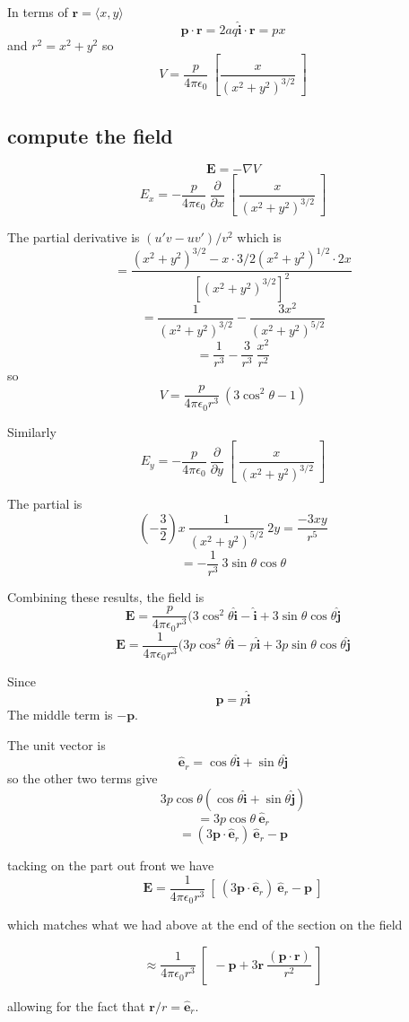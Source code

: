 \documentclass[11pt, oneside]{article}
\begin{document}
In terms of $\mathbf{r} = \langle x, y \rangle$
\[ \mathbf{p} \cdot \mathbf{r} = 2 a q \mathbf{\hat{i}} \cdot \mathbf{r} = px \]
and $r^2 = x^2 + y^2$ so
\[ V = \frac{p}{4 \pi \epsilon_0} \ [ \frac{x}{(x^2 + y^2)^{3/2}}  \ ] \]

\subsection*{compute the field}

\[ \mathbf{E} = - \nabla V \]
\[ E_x =  - \frac{p}{4 \pi \epsilon_0} \ \frac{\partial}{\partial x} \ [ \ \frac{x}{(x^2 + y^2)^{3/2}}  \ ] \]

The partial derivative is $(u'v - uv')/v^2$ which is
\[ = \frac{(x^2 + y^2)^{3/2} - x \cdot 3/2 (x^2 + y^2)^{1/2} \cdot 2x}{[(x^2  + y^2)^{3/2}]^2} \]
\[ = \frac{1}{(x^2 + y^2)^{3/2}} - \frac{3x^2}{(x^2+y^2)^{5/2}} \]
\[ = \frac{1}{r^3} - \frac{3}{r^3} \ \frac{x^2}{r^2} \]
so
\[ V = \frac{p}{4 \pi \epsilon_0 r^3} \ (3 \cos^2 \theta - 1 ) \]

Similarly
\[ E_y =  - \frac{p}{4 \pi \epsilon_0} \ \frac{\partial}{\partial y} \ [ \ \frac{x}{(x^2 + y^2)^{3/2}}  \ ] \]

The partial is
\[ (- \frac{3}{2}) x \ \frac{1}{(x^2 + y^2)^{5/2}} \ 2y = \frac{-3xy}{r^5} \]
\[ = - \frac{1}{r^3} \ 3 \sin \theta \cos \theta \]

Combining these results, the field is
\[ \mathbf{E} = \frac{p}{4 \pi \epsilon_0 r^3} (3 \cos^2 \theta \mathbf{\hat{i}} -  \mathbf{\hat{i}} + 3 \sin \theta \cos \theta  \mathbf{\hat{j}} \]
\[ \mathbf{E} = \frac{1}{4 \pi \epsilon_0 r^3} (3p \cos^2 \theta \mathbf{\hat{i}} -  p\mathbf{\hat{i}} + 3p \sin \theta \cos \theta  \mathbf{\hat{j}} \]

Since 
\[ \mathbf{p} = p  \mathbf{\hat{i}} \]
The middle term is $- \mathbf{p}$. 

The unit vector is
\[  \mathbf{\hat{e}}_r = \cos \theta  \mathbf{\hat{i}} + \sin \theta  \mathbf{\hat{j}} \]
so the other two terms give
\[ 3p \cos \theta ( \cos \theta \mathbf{\hat{i}} + \sin \theta \mathbf{\hat{j}}) \]
\[ = 3p \cos \theta \ \mathbf{\hat{e}}_r \]
\[ = (3 \mathbf{p} \cdot \mathbf{\hat{e}}_r) \ \mathbf{\hat{e}}_r - \mathbf{p} \]

tacking on the part out front we have
\[ \mathbf{E} =  \frac{1}{4 \pi \epsilon_0 r^3} \ [ \ (3 \mathbf{p} \cdot \mathbf{\hat{e}}_r) \ \mathbf{\hat{e}}_r - \mathbf{p} \ ] \]

which matches what we had above at the end of the section on the field

\[ \approx \frac{1}{4 \pi \epsilon_0 r^3} \ [ \  \ - \mathbf{p} + 3 \mathbf{r} \ \frac{(\mathbf{p} \cdot \mathbf{r} )}{r^2} \ ] \]

allowing for the fact that $\mathbf{r}/r = \mathbf{\hat{e}}_r$.
\end{document}
